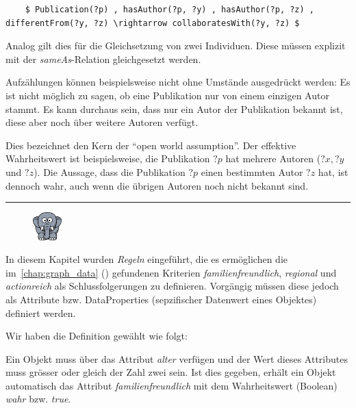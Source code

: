 \lstset{language=XML}
\begin{lstlisting}
    $ Publication(?p) , hasAuthor(?p, ?y) , hasAuthor(?p, ?z) , differentFrom(?y, ?z) \rightarrow collaboratesWith(?y, ?z) $
\end{lstlisting}

Analog gilt dies für die Gleichsetzung von zwei Individuen. Diese müssen explizit mit der \textit{sameAs}-Relation gleichgesetzt werden.

Aufzählungen können beispielsweise nicht ohne Umstände ausgedrückt werden: Es ist nicht möglich zu sagen, ob eine Publikation nur von einem einzigen Autor stammt. Es kann durchaus sein, dass nur ein Autor der Publikation bekannt ist, diese aber noch über weitere Autoren verfügt.

Dies bezeichnet den Kern der ``open world assumption''. Der effektive Wahrheitswert ist beispielsweise, die Publikation $?p$  hat mehrere Autoren ($?x, ?y$ und $?z$). Die Aussage, dass die Publikation $?p$ einen bestimmten Autor $?z$ hat, ist dennoch wahr, auch wenn die übrigen Autoren noch nicht bekannt sind.

\noindent\rule[1ex]{\textwidth}{1pt}
\begin{figure}
    \vspace{-14pt}
    \includegraphics[width=0.1\textwidth]{bilder/elephant.png}
\end{figure}
In diesem Kapitel wurden \textit{Regeln} eingeführt, die es ermöglichen die im~\autoref{chap:graph_data} () gefundenen Kriterien \textit{familienfreundlich}, \textit{regional} und \textit{actionreich} als Schlussfolgerungen zu definieren. Vorgängig müssen diese jedoch als Attribute bzw. DataProperties (sepzifischer Datenwert eines Objektes) definiert werden.

Wir haben die Definition gewählt wie folgt:

Ein Objekt muss über das Attribut \textit{alter} verfügen und der Wert dieses Attributes muss grösser oder gleich der Zahl zwei sein. Ist dies gegeben, erhält ein Objekt automatisch das Attribut \textit{familienfreundlich} mit dem Wahrheitswert (Boolean) \textit{wahr} bzw. \textit{true}.

